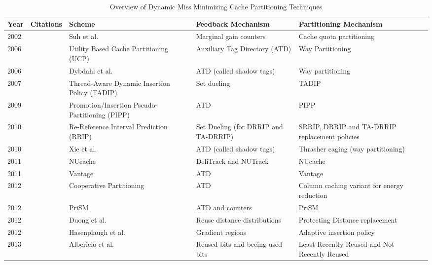 
\begin{table*}[tp]
	\caption{Overview of Dynamic Miss Minimizing Cache Partitioning Techniques}
	\label{tab:cachePartTaxonomy}
	\begin{tabularx}{\textwidth}{lcXXXX}
	\toprule
	Year & Citations & Scheme & Feedback Mechanism & Partitioning Mechanism \\	
	\midrule
	2002 & & Suh et al.\ \cite{suh02,dynPartofSharedCacheMemory} & Marginal gain counters & Cache quota partitioning \\	
	2006 & & Utility Based Cache Partitioning (UCP) \cite{utilityBasedCachePartitioning} & Auxiliary Tag Directory (ATD) & Way Partitioning \\ 
	2006 & & Dybdahl et al.\ \cite{haakonHiPC} & ATD (called shadow tags) & Way partitioning \\
	2007 & & Thread-Aware Dynamic Insertion Policy (TADIP) \cite{jaleel08} & Set dueling \cite{shadowTagInsertionPolicies} & TADIP \\
	2009 & & Promotion/Insertion Pseudo-Partitioning (PIPP) \cite{xie09} & ATD & PIPP \\
	2010 & & Re-Reference Interval Prediction (RRIP) \cite{jaleel10} & Set Dueling (for DRRIP and TA-DRRIP) & SRRIP, DRRIP and TA-DRRIP replacement policies \\
	2010 & & Xie et al.\ \cite{xie10} & ATD (called shadow tags) & Thrasher caging (way partitioning) \\
	2011 & & NUcache \cite{manikantan11} & DeliTrack and NUTrack & NUcache \\
	2011 & & Vantage \cite{sanchez11} & ATD & Vantage \\
	2012 & & Cooperative Partitioning \cite{sundararajan12} & ATD & Column caching variant for energy reduction \\ %
	2012 & & PriSM \cite{manikantan12} & ATD and counters & PriSM \\ %
	2012 & & Duong et al.\ \cite{duong12} & Reuse distance distributions &Protecting Distance replacement \\
	2012 & & Hasenplaugh et al.\ \cite{hasenplaugh12}  & Gradient regions & Adaptive insertion policy \\ %
	2013 & &  Albericio et al.\ \cite{albericio13}  & Reused bits and beeing-used bits & Least Recently Reused and Not Recently Reused \\ %
	\bottomrule
	\end{tabularx}	
\end{table*}


